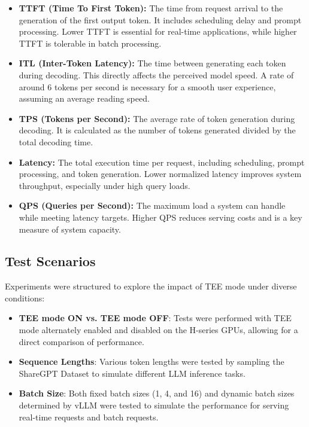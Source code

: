 \documentclass{article}
\begin{document}
\begin{itemize}
    \item \textbf{TTFT (Time To First Token):} The time from request arrival to the generation of the first output token. It includes scheduling delay and prompt processing. Lower TTFT is essential for real-time applications, while higher TTFT is tolerable in batch processing.

    \item \textbf{ITL (Inter-Token Latency):} The time between generating each token during decoding. This directly affects the perceived model speed. A rate of around 6 tokens per second is necessary for a smooth user experience, assuming an average reading speed.

    \item \textbf{TPS (Tokens per Second):} The average rate of token generation during decoding. It is calculated as the number of tokens generated divided by the total decoding time.

    \item \textbf{Latency:} The total execution time per request, including scheduling, prompt processing, and token generation. Lower normalized latency improves system throughput, especially under high query loads.

    \item \textbf{QPS (Queries per Second):} The maximum load a system can handle while meeting latency targets. Higher QPS reduces serving costs and is a key measure of system capacity.
\end{itemize}


\subsection{Test Scenarios}

Experiments were structured to explore the impact of TEE mode under diverse conditions:
\begin{itemize}
    \item \textbf{TEE mode ON vs. TEE mode OFF}: Tests were performed with TEE mode alternately enabled and disabled on the H-series GPUs, allowing for a direct comparison of performance.
    \item \textbf{Sequence Lengths}: Various token lengths were tested by sampling the ShareGPT Dataset \cite{sharegpt} to simulate different LLM inference tasks.
    \item \textbf{Batch Size}: Both fixed batch sizes (1, 4, and 16) and dynamic batch sizes determined by vLLM \cite{kwon2023efficient} were tested to simulate the performance for serving real-time requests and batch requests.
\end{itemize}
\end{document}
